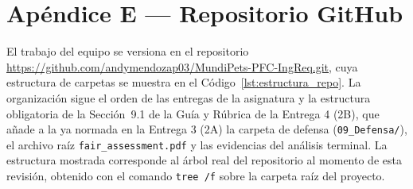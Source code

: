 \documentclass[journal,onecolumn]{IEEEtran}
\begin{document}
	\section*{Apéndice E --- Repositorio GitHub}
	\label{ap:repositorio}
	
	El trabajo del equipo se versiona en el repositorio
	\url{https://github.com/andymendozap03/MundiPets-PFC-IngReq.git}, cuya
	estructura de carpetas se muestra en el Código~\ref{lst:estructura_repo}. La
	organización sigue el orden de las entregas de la asignatura y la
	estructura obligatoria de la Sección~9.1 de la Guía y Rúbrica de la Entrega
	4 (2B), que añade a la ya normada en la Entrega 3 (2A) la carpeta de
	defensa (\texttt{09\_Defensa/}), el archivo raíz
	\texttt{fair\_assessment.pdf} y las evidencias del análisis terminal. La
	estructura mostrada corresponde al árbol real del repositorio al momento de
	esta revisión, obtenido con el comando \texttt{tree /f} sobre la carpeta
	raíz del proyecto.
	
\end{document}
